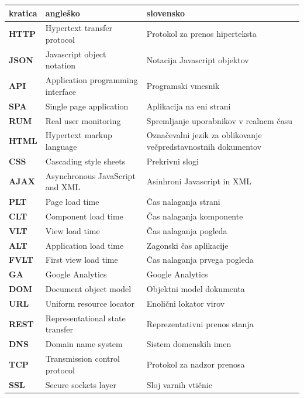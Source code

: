 \documentclass[a4paper, 12pt]{book}
\begin{document}
\noindent\begin{tabular}{p{}|p{}|p{}}    %
  {\bf kratica} & {\bf angleško}                             & {\bf slovensko} \\ \hline
  {\bf HTTP}      & Hypertext transfer protocol  & Protokol za prenos hiperteksta \\
  {\bf JSON} & Javascript object notation & Notacija Javascript objektov \\
  {\bf API}   & Application programming interface   & Programski vmesnik \\
  {\bf SPA}   & Single page application     & Aplikacija na eni strani \\
  {\bf RUM}   & Real user monitoring              & Spremljanje uporabnikov v realnem času \\
  {\bf HTML}   & Hypertext markup language     & Označevalni jezik za oblikovanje večpredstavnostnih dokumentov \\
  {\bf CSS}   & Cascading style sheets              & Prekrivni slogi \\
  {\bf AJAX}   & Asynchronous JavaScript and XML              & Asinhroni Javascript in XML \\
  {\bf PLT}   & Page load time              & Čas nalaganja strani \\
  {\bf CLT}   & Component load time              & Čas nalaganja komponente \\
  {\bf VLT}   & View load time              & Čas nalaganja pogleda \\
  {\bf ALT}   & Application load time              & Zagonski čas aplikacije \\
  {\bf FVLT}   & First view load time              & Čas nalaganja prvega pogleda \\
  {\bf GA}   & Google Analytics              & Google Analytics \\
  {\bf DOM}   & Document object model              & Objektni model dokumenta \\
  {\bf URL}   & Uniform resource locator              & Enolični lokator virov \\
  {\bf REST}   & Representational state transfer              & Reprezentativni prenos stanja \\
  {\bf DNS}   & Domain name system              & Sistem domenskih imen \\
  {\bf TCP}   & Transmission control protocol             & Protokol za nadzor prenosa \\
  {\bf SSL}   & Secure sockets layer  & Sloj varnih vtičnic \\
                          
\end{tabular}
\end{document}

